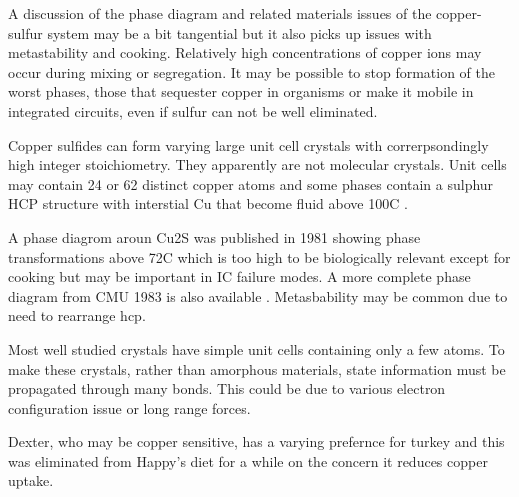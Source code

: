  

A discussion of the phase diagram and related materials
issues of the copper-sulfur system may be a bit tangential
but it also picks up issues with metastability and cooking.
Relatively high concentrations of copper ions may occur during
mixing or segregation.
It may be possible to stop formation of the worst phases,
those that sequester copper in organisms or make it
mobile in integrated circuits, even if sulfur can not
be well eliminated. 

Copper sulfides can form varying large unit cell crystals 
with correrpsondingly high integer stoichiometry. 
They apparently are not molecular crystals.
Unit cells may contain 24 or 62 distinct copper atoms and some phases
contain a sulphur HCP structure with interstial Cu that become
fluid above 100C \cite{Evans_crystal_structures_}.

A phase diagrom aroun Cu2S was published in 1981
showing phase transformations above 72C
\cite{Evans1981CopperCI} which is too high to be biologically
relevant except for cooking but may be important
in IC failure modes. 
A more complete phase diagram from CMU 1983 is also available
\cite{Chakrabarti_Laughlin_Copper_1983}.
Metasbability may be common due to need to rearrange hcp.


Most well studied crystals have simple unit cells containing
only a few atoms. To make these crystals, rather than amorphous
materials, state information must be propagated through
many bonds. This could be due to various electron configuration
issue or long range forces. 




\begin{comment}
\begin{figure}[ht]
\begin{align}
\cee{H2O &<=> H^{+}_{(aq)} + OH^{-}_{(aq)}} \\
\cee{Cl_{2} + 2OH^{-}  & <=> Cl^{-} + O-Cl + H_{2}O_{l} \label{r:ecbleach} } \\
\cee{Cl_{2} + 2NaOH & -> NaCl + NaClO + H_{2}O \label{r:hypochlorate}}\\
\cee{NaCl + 3H_{2}O & <=> NaClO_3 + 3H_2 \label{r:chlorate}} \\
\cee{ H_{2}O_{2} + NaClO & -> NaCl + H_{2}O + O_{2} \label{r:bleachperoxide}}\\
\end{align}
\caption{ \label{fig:reacts} test to see how chemfig works.  wtf is outer par mode?  Some reactions thought to be relevant to generation, decay, and
efficacy of electrolyzed water solutions. }
\end{figure}

\end{comment}

Dexter, who may be copper sensitive, has a varying prefernce
for turkey and this was eliminated from Happy's diet for a while
on the concern it reduces copper uptake.


